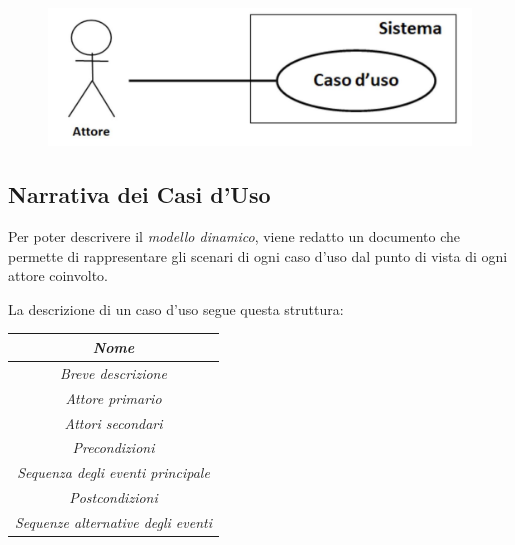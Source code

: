 \begin{figure}[h]
    \centering
    \includegraphics[scale=0.5]{img/caso.png}
\end{figure}

\subsection{Narrativa dei Casi d'Uso}
Per poter descrivere il \emph{modello dinamico}, viene redatto un documento che permette di
rappresentare gli scenari di ogni caso d'uso dal punto di vista di ogni attore coinvolto.

La descrizione di un caso d'uso segue questa struttura:

\begin{center}
    \begin{tabular}{||c||}
        \hline
        \emph{Nome} \\
        \hline
        \emph{Breve descrizione} \\
        \hline
        \emph{Attore primario} \\
        \hline
        \emph{Attori secondari} \\
        \hline
        \emph{Precondizioni} \\
        \hline
        \emph{Sequenza degli eventi principale} \\
        \hline
        \emph{Postcondizioni} \\
        \hline
        \emph{Sequenze alternative degli eventi} \\
        \hline
    \end{tabular}
\end{center}

